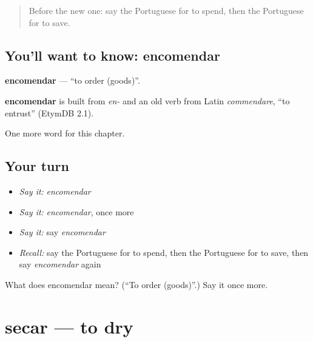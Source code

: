 \label{lesson:PT-C201-encomendar}



\begin{quote}
Before the new one: say the Portuguese for to spend, then the Portuguese for to save.
\end{quote}

\subsection*{You'll want to know: encomendar}
\textbf{encomendar} — \textquotedblleft{}to order (goods)\textquotedblright{}.

\begin{cousinweb}
\textbf{encomendar} is built from \emph{en-} and an old verb from Latin \emph{commendare}, \textquotedblleft{}to entrust\textquotedblright{} (EtymDB 2.1).
\end{cousinweb}

\begin{grammarlens}[title={What you've built}]
One more word for this chapter.
\end{grammarlens}

\subsection*{Your turn}
\begin{itemize}
\raggedright
  \item \emph{Say it:} \emph{encomendar}
  \item \emph{Say it:} \emph{encomendar}, once more
  \item \emph{Say it:} say \emph{encomendar}
  \item \emph{Recall:} say the Portuguese for to spend, then the Portuguese for to save, then say \emph{encomendar} again
\end{itemize}

\begin{tcolorbox}[breakable,colback=teal!4,colframe=teal!35!black,title={Before you move on}]
What does encomendar mean? (\textquotedblleft{}To order (goods)\textquotedblright{}.) Say it once more.
\end{tcolorbox}
\section[secar]{secar — to dry}

\label{lesson:PT-C201-secar}



